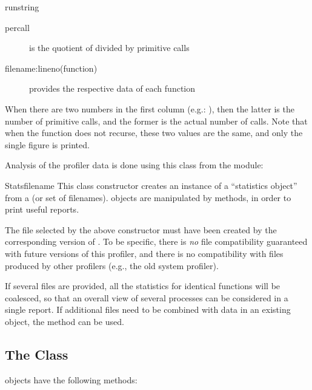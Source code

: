 \begin{funcdesc}{run}{string}
\begin{description}
\item[percall ]
is the quotient of  divided by primitive calls

\item[filename:lineno(function) ]
provides the respective data of each function

\end{description}

When there are two numbers in the first column (e.g.: ),
then the latter is the number of primitive calls, and the former is
the actual number of calls.  Note that when the function does not
recurse, these two values are the same, and only the single figure is
printed.

\end{funcdesc}

Analysis of the profiler data is done using this class from the
 module:


\begin{classdesc}{Stats}{filename}
This class constructor creates an instance of a ``statistics object''
from a  (or set of filenames).   objects are
manipulated by methods, in order to print useful reports.

The file selected by the above constructor must have been created by
the corresponding version of .  To be specific, there is
\emph{no} file compatibility guaranteed with future versions of this
profiler, and there is no compatibility with files produced by other
profilers (e.g., the old system profiler).

If several files are provided, all the statistics for identical
functions will be coalesced, so that an overall view of several
processes can be considered in a single report.  If additional files
need to be combined with data in an existing  object, the
 method can be used.
\end{classdesc}


\subsection{The  Class \label{profile-stats}}

 objects have the following methods:

